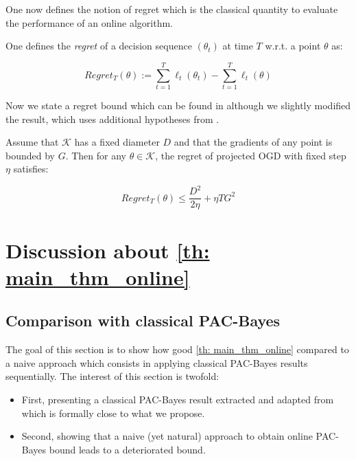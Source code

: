 One now defines the notion of regret which is the classical quantity to evaluate the performance of an online algorithm.
 \begin{definition}
One defines the \emph{regret} of a decision sequence $(\theta_t)$ at time $T$  w.r.t. a point $\theta$ as:

\[ Regret_T(\theta):= \sum_{t=1}^T \ell_t(\theta_t) -  \sum_{t=1}^T \ell_t(\theta)  \]


\end{definition}


Now we state a regret bound which can be found in \cite[Eq 2.5]{shalev2012online} although we slightly modified the result, which uses additional hypotheses from \cite{hazan2016introduction}.

\begin{proposition}
  \label{prop: OGD_bound}
  Assume that $\mathcal{K}$ has a fixed diameter $D$ and that the gradients of any point is bounded by $G$. Then for any $\theta\in\mathcal{K}$, the regret of projected OGD with fixed step $\eta$ satisfies:

  \[ Regret_T(\theta) \leq \frac{D^2}{2\eta} + \eta T G^2     \]
\end{proposition}







\section{Discussion about \cref{th: main_thm_online}}
\label{sec: discussion_main_thm}

\subsection{Comparison with classical PAC-Bayes}

\label{sec: comparison_main_thm}

The goal of this section is to show how good \cref{th: main_thm_online} compared to a naive approach which consists in applying classical PAC-Bayes results sequentially. The interest of this section is twofold:

\begin{itemize}
  \item First, presenting a classical PAC-Bayes result extracted and adapted from \cite{alquier2016properties} which is formally close to what we propose.
  \item Second, showing that a naive (yet natural) approach to obtain online PAC-Bayes bound leads to a deteriorated bound.
\end{itemize}


